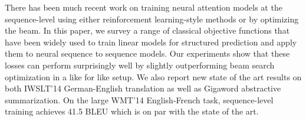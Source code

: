 There has been much recent work on training neural attention models at the sequence-level using either reinforcement learning-style methods or by optimizing the beam. In this paper, we survey a range of classical objective functions that have been widely used to train linear models for structured prediction and apply them to neural sequence to sequence models. Our experiments show that these losses can perform surprisingly well by slightly outperforming beam search optimization in a like for like setup. We also report new state of the art results on both IWSLT'14 German-English translation as well as Gigaword abstractive summarization. On the large WMT'14 English-French task, sequence-level training achieves 41.5 BLEU which is on par with the state of the art.
